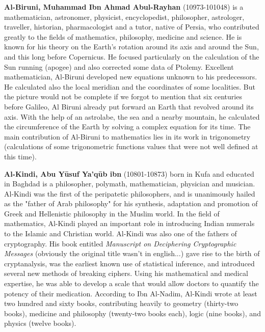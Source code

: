 \pichskip{15pt}%
\textbf{Al-Biruni, Muhammad Ibn Ahmad Abul-Rayhan} (10973-101048) is a mathematician, astronomer, physicist, encyclopedist, philosopher, astrologer, traveller, historian, pharmacologist and a tutor, native of Persia, who contributed greatly to the fields of mathematics, philosophy, medicine and science. He is known for his theory on the Earth's rotation around its axis and around the Sun, and this long before Copernicus. He focused particularly on the calculation of the Sun running (apogee) and also corrected some data of Ptolemy. Excellent mathematician, Al-Biruni developed new equations unknown to his predecessors. He calculated also the local meridian and the coordinates of some localities. But the picture would not be complete if we forgot to mention that six centuries before Galileo, Al Biruni already put forward an Earth that revolved around its axis. With the help of an astrolabe, the sea and a nearby mountain, he calculated the circumference of the Earth by solving a complex equation for its time. The main contribution of Al-Biruni to mathematics lies in its work in trigonometry (calculations of some trigonometric functions values that were not well defined at this time).

\pichskip{15pt}%
\textbf{Al-Kindi, Abu Yūsuf Ya'qūb ibn} (10801-10873) born in Kufa and educated in Baghdad is a philosopher, polymath, mathematician, physician and musician. Al-Kindi was the first of the  peripatetic philosophers, and is unanimously hailed as the "father of Arab philosophy" for his synthesis, adaptation and promotion of Greek and Hellenistic philosophy in the Muslim world. In the field of mathematics, Al-Kindi played an important role in introducing Indian numerals to the Islamic and Christian world. Al-Kindi was also one of the fathers of cryptography. His book entitled \textit{Manuscript on Deciphering Cryptographic Messages} (obviously the original title wasn't in english...) gave rise to the birth of cryptanalysis, was the earliest known use of statistical inference, and introduced several new methods of breaking ciphers. Using his mathematical and medical expertise, he was able to develop a scale that would allow doctors to quantify the potency of their medication. According to Ibn Al-Nadim, Al-Kindi wrote at least two hundred and sixty books, contributing heavily to geometry (thirty-two books), medicine and philosophy (twenty-two books each), logic (nine books), and physics (twelve books).

